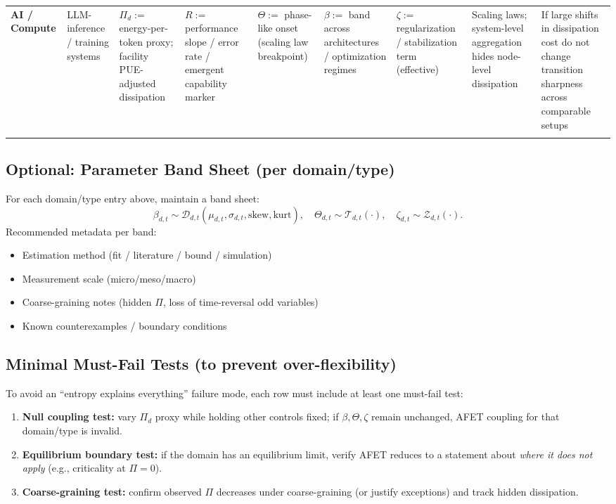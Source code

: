 \begin{longtable}{p{2.3cm} p{2.6cm} p{3.0cm} p{2.6cm} p{2.2cm} p{2.3cm} p{2.2cm} p{2.6cm} p{3.2cm}}
\textbf{AI / Compute} &
LLM-inference / training systems &
$\Pi_d :=$ energy-per-token proxy; facility PUE-adjusted dissipation &
$R :=$ performance slope / error rate / emergent capability marker &
$\Theta :=$ phase-like onset (scaling law breakpoint) &
$\beta :=$ band across architectures / optimization regimes &
$\zeta :=$ regularization / stabilization term (effective) &
Scaling laws; system-level aggregation hides node-level dissipation &
If large shifts in dissipation cost do not change transition sharpness across comparable setups \\
\\


\end{longtable}

\subsection{Optional: Parameter Band Sheet (per domain/type)}
For each domain/type entry above, maintain a band sheet:
\begin{equation}
\beta_{d,t} \sim \mathcal{D}_{d,t}(\mu_{d,t}, \sigma_{d,t}, \text{skew}, \text{kurt}),
\quad
\Theta_{d,t} \sim \mathcal{T}_{d,t}(\cdot),
\quad
\zeta_{d,t} \sim \mathcal{Z}_{d,t}(\cdot).
\end{equation}
Recommended metadata per band:
\begin{itemize}
\item Estimation method (fit / literature / bound / simulation)
\item Measurement scale (micro/meso/macro)
\item Coarse-graining notes (hidden $\Pi$, loss of time-reversal odd variables)
\item Known counterexamples / boundary conditions
\end{itemize}

\subsection{Minimal Must-Fail Tests (to prevent over-flexibility)}
To avoid an ``entropy explains everything'' failure mode, each row must include at least one must-fail test:
\begin{enumerate}
\item \textbf{Null coupling test:} vary $\Pi_d$ proxy while holding other controls fixed; if $\beta,\Theta,\zeta$ remain unchanged, AFET coupling for that domain/type is invalid.
\item \textbf{Equilibrium boundary test:} if the domain has an equilibrium limit, verify AFET reduces to a statement about \emph{where it does not apply} (e.g., criticality at $\Pi=0$).
\item \textbf{Coarse-graining test:} confirm observed $\Pi$ decreases under coarse-graining (or justify exceptions) and track hidden dissipation.
\end{enumerate}